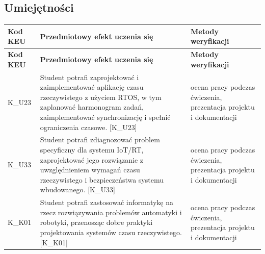\documentclass[12pt, a4paper]{article}
\newcommand{\thdrule}{\noalign{\global\setlength{\extrarowheight}{0pt}}}
\newcommand{\thdend}{\noalign{\global\setlength{\extrarowheight}{3pt}}}
\begin{document}
\subsection*{Umiejętności}
{\scriptsize
\begin{longtable}{m{1.6cm}m{9.0cm}m{4.2cm}}
\thdrule\toprule
\rowcolor{pjatkRed} {\color{white}\footnotesize\textbf{\vphantom{Ag}Kod KEU}} & {\color{white}\footnotesize\textbf{\vphantom{Ag}Przedmiotowy efekt uczenia się}} & {\color{white}\footnotesize\textbf{\vphantom{Ag}Metody weryfikacji}} \\
\midrule\thdend
\endfirsthead
\thdrule\toprule
\rowcolor{pjatkRed} {\color{white}\footnotesize\textbf{\vphantom{Ag}Kod KEU}} & {\color{white}\footnotesize\textbf{\vphantom{Ag}Przedmiotowy efekt uczenia się}} & {\color{white}\footnotesize\textbf{\vphantom{Ag}Metody weryfikacji}} \\
\midrule\thdend
\endhead
  \rowcolor{tableRowLight} K\_U23 & Student potrafi zaprojektować i zaimplementować aplikację czasu rzeczywistego z użyciem RTOS, w tym zaplanować harmonogram zadań, zaimplementować synchronizację i spełnić ograniczenia czasowe. {[}K\_U23{]} & ocena pracy podczas ćwiczenia, prezentacja projektu i dokumentacji \\
  \rowcolor{tableRowAlt} K\_U33 & Student potrafi zdiagnozować problem specyficzny dla systemu IoT/RT, zaprojektować jego rozwiązanie z uwzględnieniem wymagań czasu rzeczywistego i bezpieczeństwa systemu wbudowanego. {[}K\_U33{]} & ocena pracy podczas ćwiczenia, prezentacja projektu i dokumentacji \\
  \rowcolor{tableRowLight} K\_K01 & Student potrafi zastosować informatykę na rzecz rozwiązywania problemów automatyki i robotyki, przenosząc dobre praktyki projektowania systemów czasu rzeczywistego. {[}K\_K01{]} & ocena pracy podczas ćwiczenia, prezentacja projektu i dokumentacji \\
\bottomrule
\end{longtable}}
\end{document}
